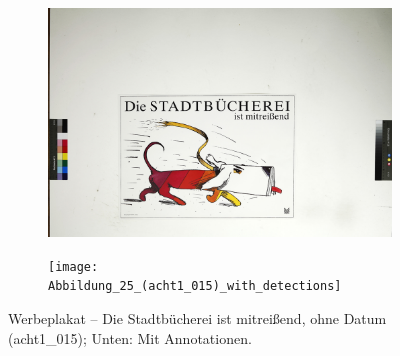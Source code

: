 \documentclass[a4paper,12pt,ngerman]{article}
\begin{document}
\newpage
\begin{figure}[ht]
	\begin{subfigure}[b]{\linewidth}
	\centering
	\includegraphics[height=\linewidth, angle=90]{Abbildung_29_(acht1_015)}
	\end{subfigure}
	\begin{subfigure}[b]{\linewidth}
	\centering
	\texttt{[image: Abbildung\_25\_(acht1\_015)\_with\_detections]}
	\end{subfigure}
	\caption{Werbeplakat – Die Stadtbücherei ist mitreißend, ohne Datum (acht1\_015); Unten: Mit Annotationen.}
\end{figure}
\end{document}
